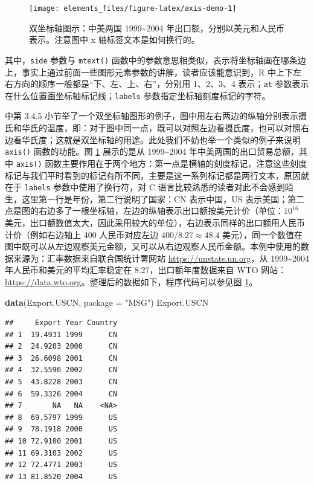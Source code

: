 \documentclass[
  b5paper,
  UTF8,twoside]{book}
\newenvironment{Shaded}{\begin{snugshade}}{\end{snugshade}}
\newcommand{\AttributeTok}[1]{\textcolor[rgb]{0.13,0.29,0.53}{#1}}
\newcommand{\FunctionTok}[1]{\textcolor[rgb]{0.13,0.29,0.53}{\textbf{#1}}}
\newcommand{\NormalTok}[1]{#1}
\newcommand{\StringTok}[1]{\textcolor[rgb]{0.31,0.60,0.02}{#1}}
\begin{document}
\begin{figure}

{\centering \texttt{[image: elements\_files/figure-latex/axis-demo-1]} 

}

\caption[中美出口额双坐标轴图示]{双坐标轴图示：中美两国 1999\textasciitilde2004 年出口额，分别以美元和人民币表示。注意图中 x 轴标签文本是如何换行的。}\label{fig:axis-demo}
\end{figure}



其中，\texttt{side} 参数与 \texttt{mtext()} 函数中的参数意思相类似，表示将坐标轴画在哪条边上，事实上通过前面一些图形元素参数的讲解，读者应该能意识到，R 中上下左右方向的顺序一般都是``下、左、上、右''，分别用 1、2、3、4 表示；\texttt{at} 参数表示在什么位置画坐标轴标记线；\texttt{labels} 参数指定坐标轴刻度标记的字符。

\citet{Murrell05} 中第 3.4.5 小节举了一个双坐标轴图形的例子，图中用左右两边的纵轴分别表示摄氏和华氏的温度，即：对于图中同一点，既可以对照左边看摄氏度，也可以对照右边看华氏度；这就是双坐标轴的用途。此处我们不妨也举一个类似的例子来说明 \texttt{axis()} 函数的功能。图 \ref{fig:axis-demo} 展示的是从 1999\textasciitilde2004 年中美两国的出口贸易总额，其中 \texttt{axis()} 函数主要作用在于两个地方：第一点是横轴的刻度标记，注意这些刻度标记与我们平时看到的标记有所不同，主要是这一系列标记都是两行文本，原因就在于 \texttt{labels} 参数中使用了换行符，对 C 语言比较熟悉的读者对此不会感到陌生，这里第一行是年份，第二行说明了国家：CN 表示中国，US 表示美国；第二点是图的右边多了一根坐标轴，左边的纵轴表示出口额按美元计价（单位：\(10^{16}\) 美元，出口额数值太大，因此采用较大的单位），右边表示同样的出口额用人民币计价（例如右边轴上 400 人民币对应左边 \(400/8.27\approx48.4\) 美元），同一个数值在图中既可以从左边观察美元金额，又可以从右边观察人民币金额。本例中使用的数据来源为：汇率数据来自联合国统计署网站 \url{https://unstats.un.org}，从 1999\textasciitilde2004 年人民币和美元的平均汇率稳定在 8.27，出口额年度数据来自 WTO 网站：\url{https://data.wto.org}。整理后的数据如下，程序代码可以参见图 \ref{fig:axis-demo}。

\begin{Shaded}
\begin{Highlighting}[]
\FunctionTok{data}\NormalTok{(Export.USCN, }\AttributeTok{package =} \StringTok{"MSG"}\NormalTok{)}
\NormalTok{Export.USCN}
\end{Highlighting}
\end{Shaded}

\begin{verbatim}
##     Export Year Country
## 1  19.4931 1999      CN
## 2  24.9203 2000      CN
## 3  26.6098 2001      CN
## 4  32.5596 2002      CN
## 5  43.8228 2003      CN
## 6  59.3326 2004      CN
## 7       NA   NA    <NA>
## 8  69.5797 1999      US
## 9  78.1918 2000      US
## 10 72.9100 2001      US
## 11 69.3103 2002      US
## 12 72.4771 2003      US
## 13 81.8520 2004      US
\end{verbatim}
\end{document}
